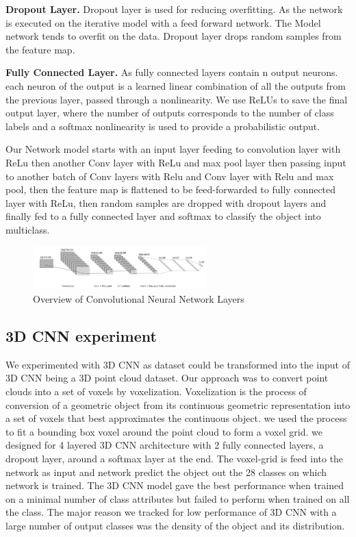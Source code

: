 \textbf{Dropout Layer.}
Dropout layer is used for reducing overfitting. As the network is executed on the iterative model with a feed forward network.
The Model network tends to overfit on the data. Dropout layer drops random samples from the feature map.

\textbf{Fully Connected Layer.}
As fully connected layers contain n output neurons.
each neuron of the output is a learned linear combination of all the outputs from the previous layer,
passed through a nonlinearity.
We use ReLUs to save the final output layer, where the number of outputs corresponds
to the number of class labels and a softmax nonlinearity is used to provide a probabilistic output.


Our Network model starts with an input layer feeding to convolution layer with ReLu then
another Conv layer with ReLu and max pool layer then passing input to another batch of Conv layers
with Relu and Conv layer with Relu and max pool, then the feature map is flattened to be feed-forwarded to
fully connected layer with ReLu, then random samples are dropped with dropout layers
and finally fed to a fully connected layer and softmax to classify the object into multiclass.

\begin{figure}[!h]
     \begin{center}
       \includegraphics[width=0.6\textwidth]{./images/object_net.pdf}
       \caption{Overview of Convolutional Neural Network Layers}
       \label{fig:cnn}
     \end{center}
\end{figure}

\subsection{3D CNN experiment}
We experimented with 3D CNN as dataset could be transformed into the input of 3D CNN being a 3D point cloud dataset. Our approach was to convert point clouds into a set of voxels by voxelization. Voxelization is the process of conversion of a geometric object from its
continuous geometric representation into a set of voxels that best approximates the continuous object. we used the process to fit a bounding box voxel around the point cloud to form a voxel grid. we designed for 4 layered 3D CNN architecture with 2 fully connected layers, a dropout layer, around a softmax layer at the end. The voxel-grid is feed into the network as input and network predict the object out the 28 classes on which network is trained. The 3D CNN model gave the best performance when trained on a minimal number of class attributes but failed to perform when trained on all the class. The major reason we tracked for low performance of 3D CNN with a large number of output classes was the
density of the object and its distribution.

